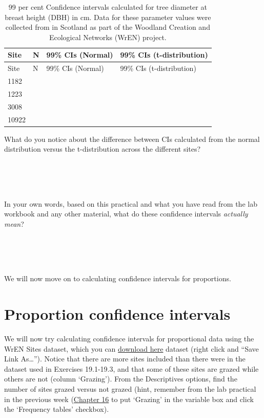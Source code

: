 \documentclass[
]{scrbook}
\begin{document}
\begin{longtable}[]{@{}llll@{}}
\caption{99 per cent Confidence intervals calculated for tree diameter at breast height (DBH) in cm. Data for these parameter values were collected from in Scotland as part of the Woodland Creation and Ecological Networks (WrEN) project.}\tabularnewline
\toprule
Site & N & 99\% CIs (Normal) & 99\% CIs (t-distribution) \\
\midrule
\endfirsthead
\toprule
Site & N & 99\% CIs (Normal) & 99\% CIs (t-distribution) \\
\midrule
\endhead
1182 & & & \\
1223 & & & \\
3008 & & & \\
10922 & & & \\
\bottomrule
\end{longtable}

What do you notice about the difference between CIs calculated from the normal distribution versus the t-distribution across the different sites?

\begin{verbatim}




\end{verbatim}

In your own words, based on this practical and what you have read from the lab workbook and any other material, what do these confidence intervals \emph{actually mean}?

\begin{verbatim}




\end{verbatim}

We will now move on to calculating confidence intervals for proportions.

\hypertarget{proportion-confidence-intervals}{%
\section{Proportion confidence intervals}\label{proportion-confidence-intervals}}

We will now try calculating confidence intervals for proportional data using the WrEN Sites dataset, which you can \href{https://raw.githubusercontent.com/bradduthie/SCIU4T4/main/data/wren_sites.csv}{download here} dataset (right click and ``Save Link As\ldots{}'').
Notice that there are more sites included than there were in the dataset used in Exercises 19.1-19.3, and that some of these sites are grazed while others are not (column `Grazing').
From the Descriptives options, find the number of sites grazed versus not grazed (hint, remember from the lab practical in the previous week (\protect\hyperlink{Chapter_16}{Chapter 16} to put `Grazing' in the variable box and click the `Frequency tables' checkbox).
\end{document}
